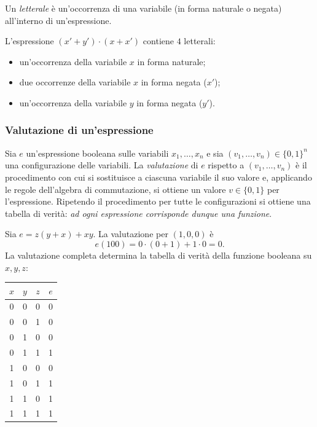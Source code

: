 \documentclass[11pt,a4paper]{article}
\begin{document}
Un \emph{letterale} è un'occorrenza di una variabile (in forma naturale o
negata) all'interno di un'espressione.

\begin{esempio}
L'espressione $(x' + y') \cdot (x + x')$ contiene $4$ letterali:
\begin{itemize}
    \item un'occorrenza della variabile $x$ in forma naturale;
    \item due occorrenze della variabile $x$ in forma negata ($x'$);
    \item un'occorrenza della variabile $y$ in forma negata ($y'$).
\end{itemize}
\end{esempio}

\subsubsection{Valutazione di un'espressione}

Sia $e$ un'espressione booleana sulle variabili $x_1, \dots, x_n$ e sia
$(v_1, \dots, v_n) \in \{0,1\}^n$ una configurazione delle variabili. La
\emph{valutazione} di $e$ rispetto a $(v_1, \dots, v_n)$ è il procedimento con
cui si sostituisce a ciascuna variabile il suo valore e, applicando le regole
dell'algebra di commutazione, si ottiene un valore $v \in \{0,1\}$ per
l'espressione. Ripetendo il procedimento per tutte le configurazioni si ottiene
una tabella di verità: \emph{ad ogni espressione corrisponde dunque una
funzione}.

\begin{esempio}
Sia $e = z(y + x) + xy$. La valutazione per $(1,0,0)$ è
\[
  e(100) = 0 \cdot (0 + 1) + 1 \cdot 0 = 0 .
\]
La valutazione completa determina la tabella di verità della funzione booleana
su $x, y, z$:
\begin{center}
\begin{tabular}{ccc|c}
$x$ & $y$ & $z$ & $e$ \\ \midrule
0 & 0 & 0 & 0 \\
0 & 0 & 1 & 0 \\
0 & 1 & 0 & 0 \\
0 & 1 & 1 & 1 \\
1 & 0 & 0 & 0 \\
1 & 0 & 1 & 1 \\
1 & 1 & 0 & 1 \\
1 & 1 & 1 & 1
\end{tabular}
\end{center}
\end{esempio}
\end{document}
